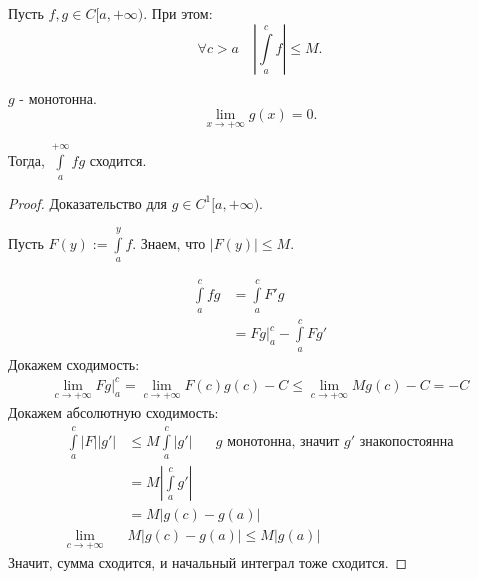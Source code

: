 \begin{theorem} \thmslashn
    
    Пусть $f, g\in C[a, +\infty)$. При этом:
    \[ \forall{c > a} \quad \left| \int\limits_{a}^{c} f\right| \le M  .\] 

    $g$ - монотонна.
    \[ \lim\limits_{x \to +\infty} g(x) = 0 .\]

    Тогда, $\int\limits_{a}^{+\infty} fg $ сходится.
    \begin{proof}
        Доказательство для $g\in C^{1}[a, +\infty)$.
        
        Пусть $F(y) := \int\limits_{a}^{y} f $. Знаем, что $|F(y)| \le M$.

        \begin{equation*}
            \begin{split}
                \int\limits_{a}^{c} fg 
                &= \int\limits_{a}^{c} F'g\\
                &= \left. Fg\right|_{a}^{c} - \int\limits_{a}^{c} Fg'   
            \end{split}
        \end{equation*}
        Докажем сходимость:
        \begin{equation*}
            \begin{split}
                \lim\limits_{c \to +\infty} \left. Fg\right|_{a}^{c} = \lim\limits_{c \to +\infty} F(c)g(c) - C \le \lim\limits_{c \to +\infty} Mg(c) - C = -C 
            \end{split}
        \end{equation*}
        Докажем абсолютную сходимость:
        \begin{equation*}
            \begin{split}
                \int\limits_{a}^{c} |F| |g'| 
                &\le M\int\limits_{a}^{c} |g'|\quad \text{ $g$  монотонна, значит $g'$ знакопостоянна}\\
                &= M\left|\int\limits_{a}^{c} g'\right|\\
                &= M|g(c)-g(a)|\\
                \lim\limits_{c \to +\infty} &M|g(c)-g(a)| \le  M|g(a)| 
            \end{split}
        \end{equation*}
        Значит, сумма сходится, и начальный интеграл тоже сходится.
    \end{proof}
\end{theorem}
